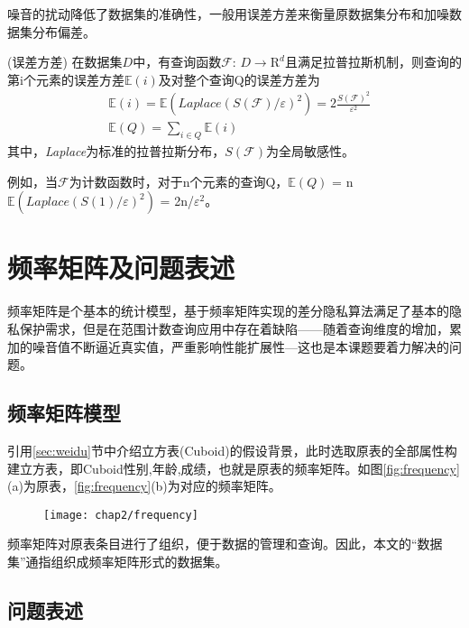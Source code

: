 噪音的扰动降低了数据集的准确性，一般用误差方差来衡量原数据集分布和加噪数据集分布偏差。
\begin{defn}
	\label{thm:error}
	(\textsc{误差方差}\cite{Dwork Calibrating}) 在数据集$D$中，有查询函数$\mathcal{F}$: $D\rightarrow \mathrm{R}^d$且满足拉普拉斯机制，则查询的第i个元素的误差方差$\mathbb{E}(i)$及对整个查询Q的误差方差为
	\begin{eqnarray}
	&\mathbb{E}(i) = \mathbb{E}(\textit{Laplace}(S(\mathcal{F})/ \varepsilon)^2) = 2\frac{S(\mathcal{F})^2}{\varepsilon^2}\\
	&\mathbb{E}(Q) = \sum\nolimits_{i \in Q}\mathbb{E}(i)
	\end{eqnarray}
	其中，\textit{Laplace}为标准的拉普拉斯分布，$S(\mathcal{F})$为全局敏感性。
\end{defn}

例如，当$\mathcal{F}$为计数函数时，对于n个元素的查询Q，$\mathbb{E}(Q)$ = n$\mathbb{E}(\textit{Laplace}(S(1)/ \varepsilon)^2)$ = 2n/$\varepsilon^2$。

\section{频率矩阵及问题表述}

频率矩阵是个基本的统计模型，基于频率矩阵实现的差分隐私算法满足了基本的隐私保护需求，但是在范围计数查询应用中存在着缺陷——随着查询维度的增加，累加的噪音值不断逼近真实值，严重影响性能扩展性---这也是本课题要着力解决的问题。

\subsection{频率矩阵模型}

引用\ref{sec:weidu}节中介绍立方表(Cuboid)的假设背景，此时选取原表的全部属性构建立方表，即Cuboid{性别,年龄,成绩}，也就是原表的频率矩阵。如图\ref{fig:frequency}(a)为原表，\ref{fig:frequency}(b)为对应的频率矩阵。

\begin{figure}[!htp]
	\centering
	\texttt{[image: chap2/frequency]}
\end{figure}

频率矩阵对原表条目进行了组织，便于数据的管理和查询。因此，本文的“数据集”通指组织成频率矩阵形式的数据集。

\subsection{问题表述}

